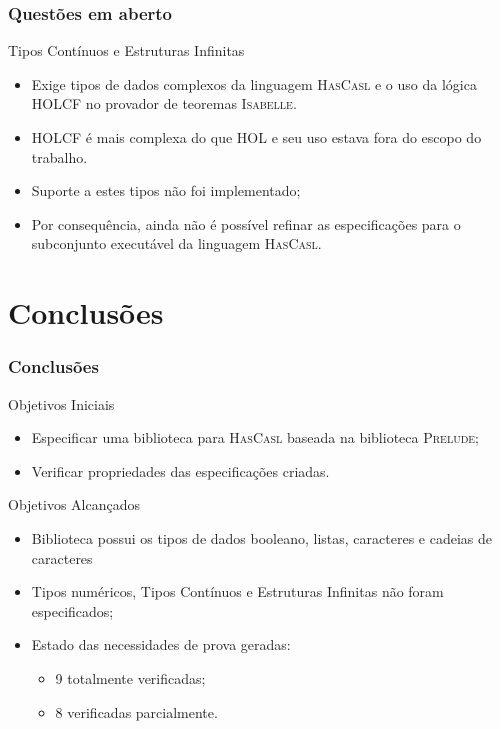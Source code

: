 \documentclass{beamer}
\newcommand{\HasCASL}{\textsc{HasCasl}\xspace}
\newcommand{\HOL}{\textsc{HOL}\xspace}
\newcommand{\Isabelle}{\textsc{Isabelle}\xspace}
\newcommand{\Prelude}{\textsc{Prelude}\xspace}
\newcommand{\HOLCF}{\textsc{HOLCF}\xspace}
\begin{document}
\begin{frame}
	\frametitle{Questões em aberto}

	\begin{block}{Tipos Contínuos e Estruturas Infinitas}
	\begin{itemize}
		\item Exige tipos de dados complexos da linguagem \HasCASL e o uso da lógica \HOLCF no provador de teoremas \Isabelle.
		\item \HOLCF é mais complexa do que \HOL e seu uso estava fora do escopo do trabalho.
		\item Suporte a estes tipos não foi implementado;
		\item Por consequência, ainda não é possível refinar as especificações para o subconjunto executável da linguagem \HasCASL.
	\end{itemize}
	\end{block}
\end{frame}

\section{Conclusões}
\begin{frame}
	\frametitle{Conclusões}
	
	\begin{block}{Objetivos Iniciais}
	\begin{itemize}
		\item Especificar uma biblioteca para \HasCASL baseada na biblioteca \Prelude;
		\item Verificar propriedades das especificações criadas.
	\end{itemize}
	\end{block}
	
	\begin{block}{Objetivos Alcançados}
	\begin{itemize}
		\item Biblioteca possui os tipos de dados booleano, listas, caracteres e cadeias de caracteres
		\item Tipos numéricos, Tipos Contínuos e Estruturas Infinitas não foram especificados;
		\item Estado das necessidades de prova geradas:
			\begin{itemize}
				\item 9 totalmente verificadas;
				\item 8 verificadas parcialmente.
			\end{itemize}
	\end{itemize}
	\end{block}
\end{frame}
\end{document}
